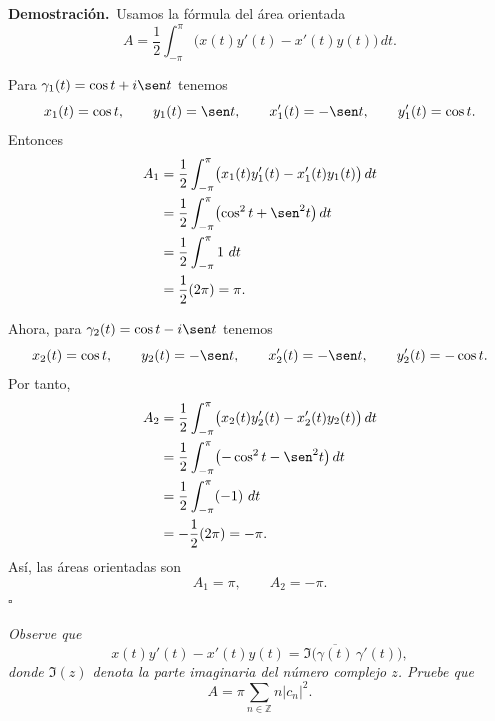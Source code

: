 \documentclass[11pt,letterpaper]{article}
\newcommand{\Z}{\mathbb{Z}}
\newcommand{\dt}{\,dt}
\begin{document}
\textbf{Demostración.}\,
Usamos la fórmula del área orientada
\begin{equation*}
    A=\frac12\int_{-\pi}^{\pi}\bigl(x(t)y'(t)-x'(t)y(t)\bigr)\dt.
\end{equation*}

Para $\gamma_1(t)=\cos t+i\sen t$ tenemos
\begin{equation*}
    x_1(t)=\cos t,
    \qquad
    y_1(t)=\sen t,
    \qquad
    x_1'(t)=-\sen t,
    \qquad
    y_1'(t)=\cos t.
\end{equation*}
Entonces
\begin{align*}
    A_1
    &=\frac12\int_{-\pi}^{\pi}\bigl(x_1(t)y_1'(t)-x_1'(t)y_1(t)\bigr)\dt \\
    &=\frac12\int_{-\pi}^{\pi}\bigl(\cos^2 t+\sen^2 t\bigr)\dt \\
    &=\frac12\int_{-\pi}^{\pi}1\,\dt \\
    &=\frac12(2\pi)=\pi.
\end{align*}

Ahora, para $\gamma_2(t)=\cos t-i\sen t$ tenemos
\begin{equation*}
    x_2(t)=\cos t,
    \qquad
    y_2(t)=-\sen t,
    \qquad
    x_2'(t)=-\sen t,
    \qquad
    y_2'(t)=-\cos t.
\end{equation*}
Por tanto,
\begin{align*}
    A_2
    &=\frac12\int_{-\pi}^{\pi}\bigl(x_2(t)y_2'(t)-x_2'(t)y_2(t)\bigr)\dt \\
    &=\frac12\int_{-\pi}^{\pi}\bigl(-\cos^2 t-\sen^2 t\bigr)\dt \\
    &=\frac12\int_{-\pi}^{\pi}(-1)\,\dt \\
    &=-\frac12(2\pi)=-\pi.
\end{align*}
Así, las áreas orientadas son
\begin{equation*}
    A_1=\pi,
    \qquad
    A_2=-\pi.\end{equation*}
\hfill $\square$

\newpage

\begin{tcolorbox}[title=\textcolor{white}{Problema 14}]
\textit{Observe que}
\begin{equation*}
    x(t)y'(t)-x'(t)y(t)=\Im\bigl(\overline{\gamma(t)}\,\gamma'(t)\bigr),
\end{equation*}
\textit{donde $\Im(z)$ denota la parte imaginaria del número complejo $z$. Pruebe que}
\begin{equation*}
    A=\pi\sum_{n\in\Z}n|c_n|^2.
\end{equation*}
\end{tcolorbox}
\end{document}
